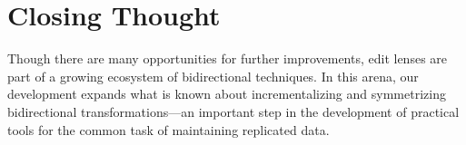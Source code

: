 \section{Closing Thought}
\label{sec:closing}
Though there are many opportunities for further improvements, edit lenses
are part of a growing ecosystem of bidirectional techniques. In this
arena, our development expands what is known about incrementalizing and
symmetrizing bidirectional transformations---an important step in the
development of practical tools for the common task of maintaining replicated
data.

